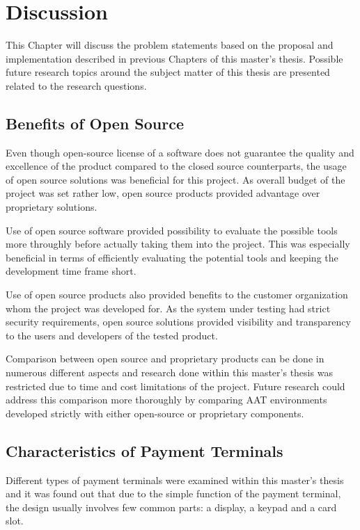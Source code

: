 
\chapter{Discussion}
\label{chapter:discussion}

This Chapter will discuss the problem statements based on the proposal and implementation described in previous Chapters of this master's thesis. Possible future research topics around the subject matter of this thesis are presented related to the research questions.

\section{Benefits of Open Source}

Even though open-source license of a software does not guarantee the quality and excellence of the product compared to the closed source counterparts, the usage of open source solutions was beneficial for this project. As overall budget of the project was set rather low, open source products provided advantage over proprietary solutions.

Use of open source software provided possibility to evaluate the possible tools more throughly before actually taking them into the project. This was especially beneficial in terms of efficiently evaluating the potential tools and keeping the development time frame short. 

Use of open source products also provided benefits to the customer organization whom the project was developed for. As the system under testing had strict security requirements, open source solutions provided visibility and transparency to the users and developers of the tested product.

Comparison between open source and proprietary products can be done in numerous different aspects and research done within this master's thesis was restricted due to time and cost limitations of the project. Future research could address this comparison more thoroughly by comparing AAT environments developed strictly with either open-source or proprietary components.

\section{Characteristics of Payment Terminals}

Different types of payment terminals were examined within this master's thesis and it was found out that due to the simple function of the payment terminal, the design usually involves few common parts: a display, a keypad and a card slot.

